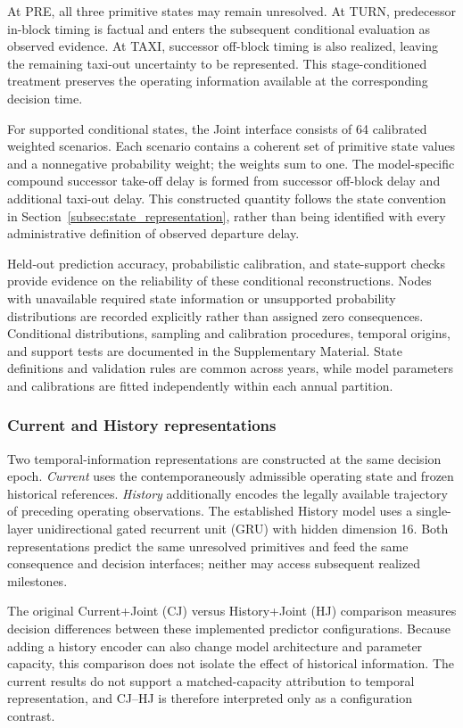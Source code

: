 At PRE, all three primitive states may remain unresolved. At TURN, predecessor in-block timing is factual and enters the subsequent conditional evaluation as observed evidence. At TAXI, successor off-block timing is also realized, leaving the remaining taxi-out uncertainty to be represented. This stage-conditioned treatment preserves the operating information available at the corresponding decision time.

For supported conditional states, the Joint interface consists of 64 calibrated weighted scenarios. Each scenario contains a coherent set of primitive state values and a nonnegative probability weight; the weights sum to one. The model-specific compound successor take-off delay is formed from successor off-block delay and additional taxi-out delay. This constructed quantity follows the state convention in Section~\ref{subsec:state_representation}, rather than being identified with every administrative definition of observed departure delay.

Held-out prediction accuracy, probabilistic calibration, and state-support checks provide evidence on the reliability of these conditional reconstructions. Nodes with unavailable required state information or unsupported probability distributions are recorded explicitly rather than assigned zero consequences. Conditional distributions, sampling and calibration procedures, temporal origins, and support tests are documented in the Supplementary Material. State definitions and validation rules are common across years, while model parameters and calibrations are fitted independently within each annual partition.

\subsubsection{Current and History representations}

Two temporal-information representations are constructed at the same decision epoch. \emph{Current} uses the contemporaneously admissible operating state and frozen historical references. \emph{History} additionally encodes the legally available trajectory of preceding operating observations. The established History model uses a single-layer unidirectional gated recurrent unit (GRU) with hidden dimension 16. Both representations predict the same unresolved primitives and feed the same consequence and decision interfaces; neither may access subsequent realized milestones.

The original Current+Joint (CJ) versus History+Joint (HJ) comparison measures decision differences between these implemented predictor configurations. Because adding a history encoder can also change model architecture and parameter capacity, this comparison does not isolate the effect of historical information. The current results do not support a matched-capacity attribution to temporal representation, and CJ--HJ is therefore interpreted only as a configuration contrast.

